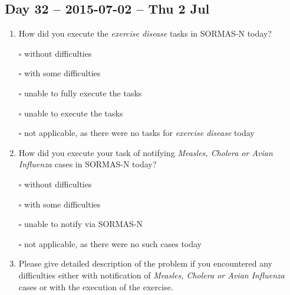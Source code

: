 \documentclass[a4paper, titlepage]{tufte-handout}
\begin{document}
\subsection{Day 32 -- 2015-07-02 -- Thu  2 Jul}
\label{sec-8-24}
\begin{enumerate}
\item How did you execute the \emph{exercise disease} tasks in SORMAS-N today?

\quad $\square$ without difficulties

\quad $\square$ with some difficulties

\quad $\square$ unable to fully execute the tasks

\quad $\square$ unable to execute the tasks

\quad $\square$ not applicable, as there were no tasks for \emph{exercise disease} today

\item How did you execute your task of notifying \emph{Measles, Cholera or Avian Influenza} cases in SORMAS-N today?

\quad $\square$ without difficulties

\quad $\square$ with some difficulties

\quad $\square$ unable to notify via SORMAS-N

\quad $\square$ not applicable, as there were no such cases today

\item Please give detailed description of the problem if you encountered any difficulties either with notification of \emph{Measles, Cholera or Avian Influenza} cases or with the execution of the exercise.

\hrulefill

\hrulefill

\hrulefill

\hrulefill

\hrulefill

\hrulefill

\hrulefill

\hrulefill

\hrulefill

\hrulefill
\end{enumerate}

\newpage
\end{document}
